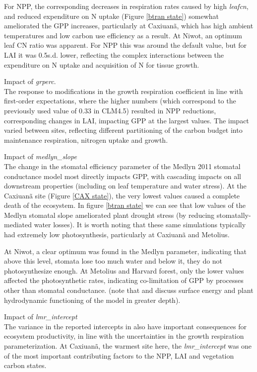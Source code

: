 \documentclass[draft,linenumbers]{agujournal}
\begin{document}
For NPP, the corresponding decreases in respiration rates caused by high \emph{leafcn}, and reduced expenditure on N uptake (Figure \ref{btran state}) somewhat ameliorated the GPP increases, particularly at Caxiuan\~a, which has high ambient temperatures and low carbon use efficiency as a result. At Niwot, an optimum leaf CN ratio was apparent. For NPP this was around the default value, but for LAI it was 0.5s.d. lower, reflecting the complex interactions between the expenditure on N uptake and acquisition of N for tissue growth. 

Impact of \emph{grperc}.\\
The response to modifications in the growth respiration coefficient in line with first-order expectations, where the higher numbers (which correspond to the previously used value of 0.33 in CLM4.5) resulted in  NPP reductions, corresponding changes in LAI, impacting GPP at the largest values.   The impact varied between sites, reflecting different partitioning of the carbon budget into maintenance respiration, nitrogen uptake and growth. 

Impact of \emph{medlyn\_slope}\\
The change in the stomatal efficiency parameter of the Medlyn 2011 stomatal conductance model most directly impacts GPP, with cascading impacts on all downstream properties (including on leaf temperature and water stress). At the Caxiuan\~a site (Figure \ref{CAX state}), the very lowest values caused a complete death of the ecosystem. In figure 
\ref{btran state} we can see that low values of the Medlyn stomatal slope ameliorated plant drought stress (by reducing stomatally-mediated water losses). It is worth noting that these same simulations typically had extremely low photosynthesis, particularly at Caxiuan\~a and Metolius. 

At Niwot, a clear optimum was found in the Medlyn parameter, indicating that above this level, stomata lose too much water and below it, they do not photosynthesize enough. At Metolius and Harvard forest, only the lower values affected the photosynthetic rates, indicating co-limitation of GPP by processes other than stomatal conductance. (note that \cite{kennedy} and \cite{dagon} discuss surface energy and plant hydrodynamic functioning of the model in greater depth). 

Impact of \emph{lmr\_intercept}\\
The variance in the reported intercepts in \cite{atkin2016} also have important consequences for ecosystem productivity, in line with the uncertainties in the growth respiration parameterization. At Caxiuan\~a, the warmest site here, the \emph{lmr\_intercept} was one of the most important contributing factors to the NPP, LAI and vegetation carbon states.  
\end{document}
